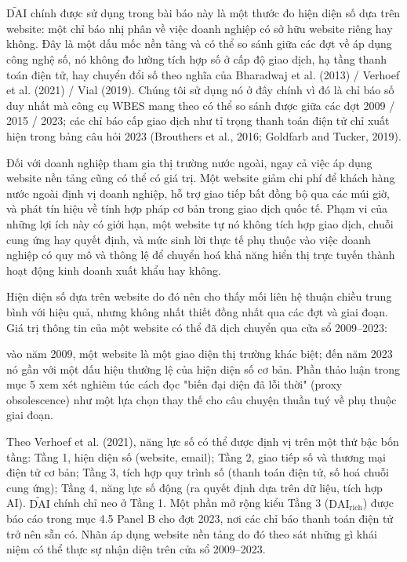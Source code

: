 \documentclass[12pt,a4paper]{article}
\begin{document}
\(\tilde{\mathrm{DAI}}\) chính được sử dụng trong bài báo này là một
thước đo hiện diện số dựa trên website: một chỉ báo nhị phân về việc
doanh nghiệp có sở hữu website riêng hay không. Đây là một dấu mốc nền
tảng và có thể so sánh giữa các đợt về áp dụng công nghệ số, nó không đo
lường tích hợp số ở cấp độ giao dịch, hạ tầng thanh toán điện tử, hay
chuyển đổi số theo nghĩa của Bharadwaj et al. (2013) / Verhoef et al.
(2021) / Vial (2019). Chúng tôi sử dụng nó ở đây chính vì đó là chỉ báo
số duy nhất mà công cụ WBES mang theo có thể so sánh được giữa các đợt
2009 / 2015 / 2023; các chỉ báo cấp giao dịch như tỉ trọng thanh toán
điện tử chỉ xuất hiện trong bảng câu hỏi 2023 (Brouthers et al., 2016;
Goldfarb and Tucker, 2019).

Đối với doanh nghiệp tham gia thị trường nước ngoài, ngay cả việc áp
dụng website nền tảng cũng có thể có giá trị. Một website giảm chi phí
để khách hàng nước ngoài định vị doanh nghiệp, hỗ trợ giao tiếp bất đồng
bộ qua các múi giờ, và phát tín hiệu về tính hợp pháp cơ bản trong giao
dịch quốc tế. Phạm vi của những lợi ích này có giới hạn, một website tự
nó không tích hợp giao dịch, chuỗi cung ứng hay quyết định, và mức sinh
lời thực tế phụ thuộc vào việc doanh nghiệp có quy mô và thông lệ để
chuyển hoá khả năng hiển thị trực tuyến thành hoạt động kinh doanh xuất
khẩu hay không.

Hiện diện số dựa trên website do đó nên cho thấy mối liên hệ thuận chiều
trung bình với hiệu quả, nhưng không nhất thiết đồng nhất qua các đợt và
giai đoạn. Giá trị thông tin của một website có thể đã dịch chuyển qua
cửa sổ 2009--2023:

vào năm 2009, một website là một giao diện thị trường khác biệt; đến năm
2023 nó gần với một dấu hiệu thường lệ của hiện diện số cơ bản. Phần
thảo luận trong mục 5 xem xét nghiêm túc cách đọc "biến đại diện đã lỗi
thời" (proxy obsolescence) như một lựa chọn thay thế cho câu chuyện
thuần tuý về phụ thuộc giai đoạn.

Theo Verhoef et al. (2021), năng lực số có thể được định vị trên một thứ
bậc bốn tầng: Tầng 1, hiện diện số (website, email); Tầng 2, giao tiếp
số và thương mại điện tử cơ bản; Tầng 3, tích hợp quy trình số (thanh
toán điện tử, số hoá chuỗi cung ứng); Tầng 4, năng lực số động (ra quyết
định dựa trên dữ liệu, tích hợp AI). \(\tilde{\mathrm{DAI}}\) chính chỉ
neo ở Tầng 1. Một phần mở rộng kiểu Tầng 3
(\(\mathrm{DAI}_{\text{rich}}\)) được báo cáo trong mục 4.5 Panel B cho
đợt 2023, nơi các chỉ báo thanh toán điện tử trở nên sẵn có. Nhãn áp
dụng website nền tảng do đó theo sát những gì khái niệm có thể thực sự
nhận diện trên cửa sổ 2009--2023.
\end{document}
